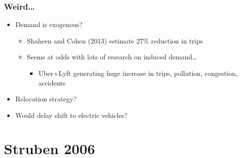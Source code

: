\documentclass{beamer}
\begin{document}
\begin{frame}
  \frametitle{Weird\dots}
  \begin{itemize}
  \item Demand is exogenous?
    \begin{itemize}
    \item Shaheen and Cohen (2013) estimate 27\% reduction in trips
    \item Seems at odds with lots of research on induced demand\dots
      \begin{itemize}
      \item Uber+Lyft generating huge increase in trips, pollution, congestion, accidents
      \end{itemize}
    \end{itemize}
  \item Relocation strategy?
  \item Would delay shift to electric vehicles?
  \end{itemize}
\end{frame}





\section{Struben 2006}
\end{document}
